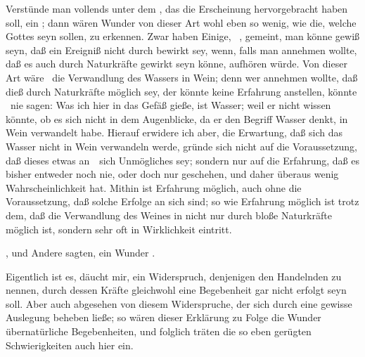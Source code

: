 \begin{aufzb}
\item Verstünde man vollends unter dem , das die Erscheinung hervorgebracht haben soll, ein ; dann wären Wunder von dieser Art wohl eben so wenig, wie die, welche  Gottes seyn sollen, zu erkennen. Zwar haben Einige, \zB\ , gemeint, man könne gewiß seyn, daß ein Ereigniß nicht durch  bewirkt sey, wenn, falls man annehmen wollte, daß es auch durch Naturkräfte gewirkt seyn könne,  aufhören würde. Von dieser Art wäre \zB\ die Verwandlung des Wassers in Wein; denn wer annehmen wollte, daß dieß durch Naturkräfte möglich sey, der könnte keine Erfahrung anstellen, könnte \zB\ nie sagen: Was ich hier in das Gefäß gieße, ist Wasser; weil er nicht wissen könnte, ob es sich nicht in dem Augenblicke, da er den Begriff Wasser denkt, in Wein verwandelt habe. Hierauf erwidere ich aber, die Erwartung, daß sich das Wasser nicht in Wein verwandeln werde, gründe sich nicht auf die Voraussetzung, daß dieses etwas an~\ sich Unmögliches sey; sondern nur auf die Erfahrung, daß es bisher entweder noch nie, oder doch nur  geschehen, und daher überaus wenig Wahrscheinlichkeit hat. Mithin ist Erfahrung möglich, auch ohne die Voraussetzung, daß solche Erfolge an sich  sind; so wie Erfahrung möglich ist trotz dem, daß die Verwandlung des Weines in  nicht nur durch bloße Naturkräfte möglich ist, sondern sehr oft in Wirklichkeit eintritt.
\end{aufzb}
\begin{aufza}\setcounter{enumi}{4}
\item {}, und Andere sagten, ein Wunder .
\end{aufza}\par
Eigentlich ist es, däucht mir, ein Widerspruch, denjenigen den Handelnden zu nennen, durch dessen Kräfte gleichwohl eine Begebenheit gar nicht erfolgt seyn soll. Aber auch abgesehen von diesem Widerspruche, der sich durch eine gewisse Auslegung beheben ließe; so wären dieser Erklärung zu Folge die Wunder übernatürliche Begebenheiten, und folglich träten die so eben gerügten Schwierigkeiten auch hier ein.
